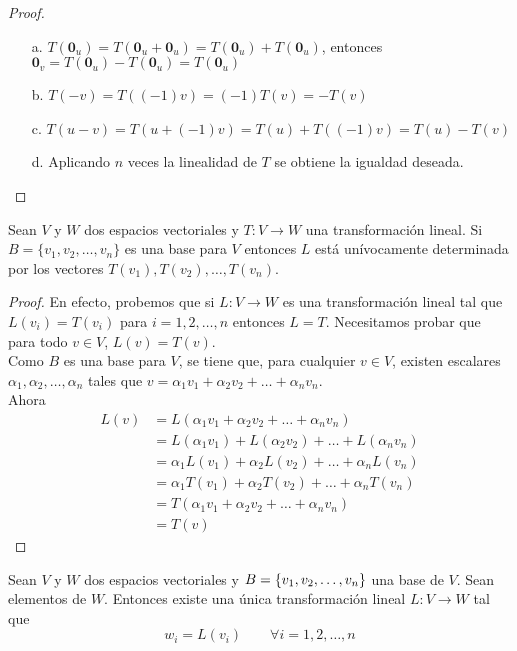 \begin{proof}
\begin{itemize}
\item[a. ] $T(\mathbf{0}_u) = T(\mathbf{0}_u + \mathbf{0}_u) = T(\mathbf{0}_u) + T(\mathbf{0}_u)$, entonces $\mathbf{0}_v = T(\mathbf{0}_u)- T(\mathbf{0}_u) = T(\mathbf{0}_u)$
\item[b. ] $T(-v) = T((-1)v) = (-1) T(v) = -T(v)$
\item [c. ] $T(u-v) = T(u+(-1)v) = T(u) + T((-1)v) = T(u) - T(v)$
\item [d. ] Aplicando $n$ veces la linealidad de $T$ se obtiene la igualdad deseada.
\end{itemize}
\end{proof}

\begin{theorem}
\label{th:ag}
Sean $V$ y $W$ dos espacios vectoriales y $T: V \to W$ una transformación lineal. Si $B = \{v_1, v_2, \ldots , v_n\}$ es una base para $V$ entonces $L$ está unívocamente determinada por los vectores $T(v_1), T(v_2), \ldots , T(v_n)$.
\end{theorem}

\begin{proof}
En efecto, probemos que si $L: V \to W$ es una transformación lineal tal que $L(v_i) = T(v_i)$ para $i = 1, 2, \ldots , n$ entonces $L = T$. Necesitamos probar que para todo $v \in V$, $L(v) = T(v)$.
\\

Como $B$ es una base para $V$, se tiene que, para cualquier $v \in V$, existen escalares $\alpha_1, \alpha_2, \ldots , \alpha_n$ tales que $v = \alpha_1 v_1 + \alpha_2 v_2 + \ldots + \alpha_n v_n$.\\

Ahora
\begin{align*}
L(v) &= L(\alpha_1 v_1 + \alpha_2 v_2 + \ldots + \alpha_n v_n)\\
&= L(\alpha_1 v_1) + L(\alpha_2 v_2) + \ldots + L(\alpha_n v_n)\\
&=\alpha_1 L(v_1) + \alpha_2 L(v_2) + \ldots + \alpha_n L(v_n)\\ 
&=\alpha_1 T(v_1) + \alpha_2 T(v_2) + \ldots + \alpha_n T(v_n)\\
&= T(\alpha_1 v_1 + \alpha_2 v_2 + \ldots + \alpha_n v_n)\\
&= T(v) 
\end{align*}
\end{proof}

\begin{theorem}
Sean $V$ y $W$ dos espacios vectoriales y $B =  \lbrace v_1, v_2, \ldots, v_n \rbrace$ una base de $V$. Sean  elementos de $W$. Entonces existe una única transformación lineal $L: V \to W$ tal que 
$$w_i = L(v_i)\qquad \forall i = 1, 2, \ldots, n$$
\end{theorem}

